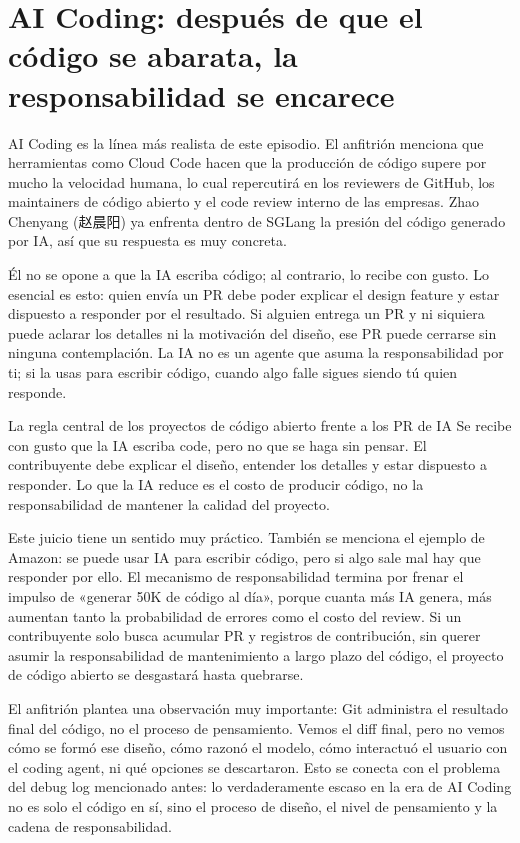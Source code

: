 \section{AI Coding: después de que el código se abarata, la responsabilidad se encarece}

AI Coding es la línea más realista de este episodio. El anfitrión menciona que herramientas como Cloud Code hacen que la producción de código supere por mucho la velocidad humana, lo cual repercutirá en los reviewers de GitHub, los maintainers de código abierto y el code review interno de las empresas. Zhao Chenyang (赵晨阳) ya enfrenta dentro de SGLang la presión del código generado por IA, así que su respuesta es muy concreta.

Él no se opone a que la IA escriba código; al contrario, lo recibe con gusto. Lo esencial es esto: quien envía un PR debe poder explicar el design feature y estar dispuesto a responder por el resultado. Si alguien entrega un PR y ni siquiera puede aclarar los detalles ni la motivación del diseño, ese PR puede cerrarse sin ninguna contemplación. La IA no es un agente que asuma la responsabilidad por ti; si la usas para escribir código, cuando algo falle sigues siendo tú quien responde.

\begin{importantbox}{La regla central de los proyectos de código abierto frente a los PR de IA}
Se recibe con gusto que la IA escriba code, pero no que se haga sin pensar. El contribuyente debe explicar el diseño, entender los detalles y estar dispuesto a responder. Lo que la IA reduce es el costo de producir código, no la responsabilidad de mantener la calidad del proyecto.
\end{importantbox}

Este juicio tiene un sentido muy práctico. También se menciona el ejemplo de Amazon: se puede usar IA para escribir código, pero si algo sale mal hay que responder por ello. El mecanismo de responsabilidad termina por frenar el impulso de «generar 50K de código al día», porque cuanta más IA genera, más aumentan tanto la probabilidad de errores como el costo del review. Si un contribuyente solo busca acumular PR y registros de contribución, sin querer asumir la responsabilidad de mantenimiento a largo plazo del código, el proyecto de código abierto se desgastará hasta quebrarse.

El anfitrión plantea una observación muy importante: Git administra el resultado final del código, no el proceso de pensamiento. Vemos el diff final, pero no vemos cómo se formó ese diseño, cómo razonó el modelo, cómo interactuó el usuario con el coding agent, ni qué opciones se descartaron. Esto se conecta con el problema del debug log mencionado antes: lo verdaderamente escaso en la era de AI Coding no es solo el código en sí, sino el proceso de diseño, el nivel de pensamiento y la cadena de responsabilidad.

